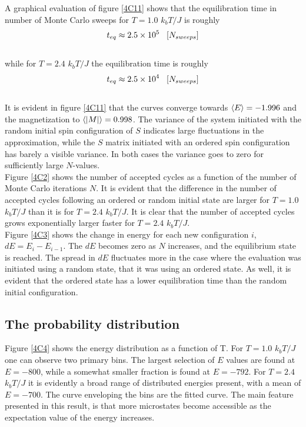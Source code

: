 \documentclass[%
reprint,nofootinbib,
amsmath,amssymb,
aps,
]{revtex4-1}
\begin{document}
\newpage \noindent 
A graphical evaluation of figure \ref{4C11} shows that the equilibration time in number of Monte Carlo sweeps for $T = 1.0$ $k_bT/J$ is roughly
\begin{equation*}
t_{eq} \approx 2.5\times10^5 \hspace{3mm}[N_{sweeps}]
\end{equation*}\\
while for $T = 2.4$ $k_bT/J$ the equilibration time is roughly \\  
\begin{equation*}
t_{eq} \approx 2.5\times10^4 \hspace{3mm}[N_{sweeps}]
\end{equation*} \\  \indent 
It is evident in figure \ref{4C11} that the curves converge towards $\expval{E} = -1.996$ and the magnetization to $\expval{\abs{M}} = 0.998$. 
The variance of the system initiated with the random initial spin configuration of $S$ indicates large fluctuations in the approximation, while the $S$ matrix initiated with an ordered spin configuration has barely a visible variance. In both cases the variance goes to zero for sufficiently large $N$-values. \\ \indent 
Figure \ref{4C2} shows the number of accepted cycles as a function of the number of Monte Carlo iterations $N$. It is evident that the difference in the number of accepted cycles following an ordered or random initial state are larger for $T = 1.0$ $k_bT/J$ than it is for $T = 2.4$ $k_bT/J$. It is clear that the number of accepted cycles grows exponentially larger faster for $T = 2.4$ $k_bT/J$. \\
Figure \ref{4C3} shows the change in energy for each new configuration $i$, $dE = E_i-E_{i-1}$. The $dE$ becomes zero as $N$ increases, and the equilibrium state is reached. The spread in $dE$ fluctuates more in the case where the evaluation was initiated using a random state, that it was using an ordered state. As well, it is evident that the ordered state has a lower equilibration time than the random initial configuration. \\ \indent   

\subsection*{The probability distribution } \noindent 
Figure \ref{4C4} shows the energy distribution as a function of T. For $T = 1.0$ $k_bT/J$ one can observe two primary bins. The largest selection of $E$ values are found at $E = -800$, while a somewhat smaller fraction is found at $E = - 792$. For $T = 2.4$ $k_bT/J$ it is evidently a broad range of distributed energies present, with a mean of $E = - 700$. The curve enveloping the bins are the fitted curve. The main feature presented in this result, is that more microstates become accessible as the expectation value of the energy increases. 
\end{document}
